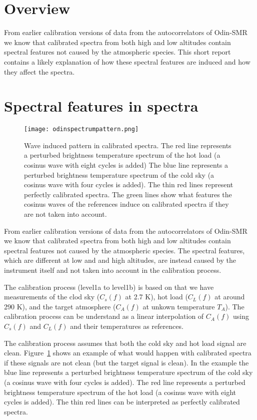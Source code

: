 \section{Overview}
From earlier calibration versions of data from the autocorrelators
of Odin-SMR we know that calibrated spectra from both high and 
low altitudes contain spectral features not caused by the atmospheric
species.
This short report contains a likely explanation
of how these spectral features are induced
and how they affect the spectra.


\clearpage
\newpage

\section{Spectral features in spectra}
\begin{figure}[!t]
\centering
\texttt{[image: odinspectrumpattern.png]}\\
\caption{Wave induced pattern in calibrated spectra. The red line represents 
a perturbed brightness temperature spectrum of the
hot load (a cosinus wave with eight cycles is added)
The blue line represents a perturbed brightness temperature
spectrum of the cold sky (a cosinus wave with four cycles is added).
The thin red lines represent perfectly calibrated spectra.
The green lines show what features the cosinus waves of the
references induce on calibrated spectra if they are not taken into account.
}
\label{fig:study2ac2a}
\end{figure}

From earlier calibration versions of data from the autocorrelators
of Odin-SMR we know that calibrated spectra from both high and 
low altitudes contain spectral features not caused by the atmospheric
species. 
The spectral features, which are different at low and and high altitudes, 
are instead caused by the instrument itself and not taken into account
in the calibration process.

The calibration process (level1a to level1b) is based on that we have 
measurements of the clod sky (\(C_{s}(f)\) at 2.7 K), hot load (\(C_{L}(f)\)
at around 290 K), and the target atmosphere (\(C_{A}(f)\) 
at unkown temperature \(T_{A}\)).
The calibration process can be understand as a linear interpolation
of \(C_{A}(f)\)  using \(C_{s}(f)\) and \(C_{L}(f)\) and their temperatures
as references.
 
The calibration process assumes that both the cold sky and hot load signal
are clean. Figure~\ref{fig:study2ac2a} shows an example of what would happen with
calibrated spectra if these signals are not clean
(but the target signal is clean).
In the example the blue line represents a perturbed brightness temperature
spectrum of the cold sky (a cosinus wave with four cycles is added).
The red line represents a perturbed brightness temperature spectrum of the
hot load (a cosinus wave with eight cycles is added).
The thin red lines can be interpreted as perfectly calibrated spectra.

